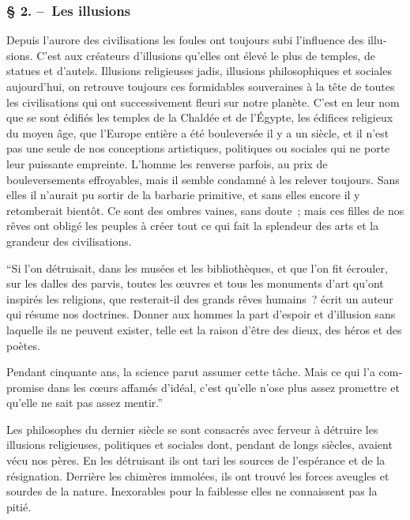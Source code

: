 \documentclass[french,twoside]{book} %
\begin{document}
\subsubsection[{§ 2. – Les illusions}]{§ 2. – Les illusions}
\noindent Depuis l’aurore des civilisations les foules ont toujours subi l’influence des illu­sions. C’est aux créateurs d’illusions qu’elles ont élevé le plus de temples, de statues et d’autels. Illusions religieuses jadis, illusions philosophiques et sociales aujourd’hui, on retrouve toujours ces formidables souveraines à la tête de toutes les civilisations qui ont successivement fleuri sur notre planète. C’est en leur nom que se sont édifiés les temples de la Chaldée et de l’Égypte, les édifices religieux du moyen âge, que l’Europe entière a été bouleversée il y a un siècle, et il n’est pas une seule de nos conceptions artistiques, politiques ou sociales qui ne porte leur puissante empreinte. L’homme les renverse parfois, au prix de bouleversements effroyables, mais il semble condamné à les relever toujours. Sans elles il n’aurait pu sortir de la barbarie primi­tive, et sans elles encore il y retomberait bientôt. Ce sont des ombres vaines, sans doute ; mais ces filles de nos rêves ont obligé les peuples à créer tout ce qui fait la splendeur des arts et la grandeur des civilisations.\par
“Si l’on détruisait, dans les musées et les bibliothèques, et que l’on fit écrouler, sur les dalles des parvis, toutes les œuvres et tous les monuments d’art qu’ont inspirés les religions, que resterait-il des grands rêves humains ? écrit un auteur qui résume nos doctrines. Donner aux hommes la part d’espoir et d’illusion sans laquelle ils ne peuvent exister, telle est la raison d’être des dieux, des héros et des poètes.\par
Pendant cinquante ans, la science parut assumer cette tâche. Mais ce qui l’a com­promise dans les cœurs affamés d’idéal, c’est qu’elle n’ose plus assez promettre et qu’elle ne sait pas assez mentir.”\par
Les philosophes du dernier siècle se sont consacrés avec ferveur à détruire les illusions religieuses, politiques et sociales dont, pendant de longs siècles, avaient vécu nos pères. En les détruisant ils ont tari les sources de l’espérance et de la résignation. Derrière les chimères immolées, ils ont trouvé les forces aveugles et sourdes de la nature. Inexorables pour la faiblesse elles ne connaissent pas la pitié.\par
\end{document}
